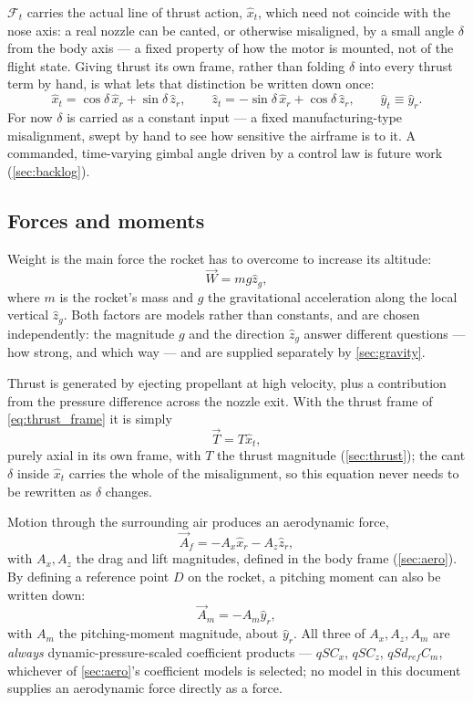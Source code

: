 $\mathcal{F}_t$ carries the actual line of thrust action, $\hat{x}_t$, which need not coincide
with the nose axis: a real nozzle can be canted, or otherwise misaligned, by a small angle
$\delta$ from the body axis --- a fixed property of how the motor is mounted, not of the flight
state. Giving thrust its own frame, rather than folding $\delta$ into every thrust term by hand,
is what lets that distinction be written down once:
\begin{equation}\label{eq:thrust_frame}
    \hat{x}_t = \cos\delta\,\hat{x}_r + \sin\delta\,\hat{z}_r, \qquad
    \hat{z}_t = -\sin\delta\,\hat{x}_r + \cos\delta\,\hat{z}_r, \qquad \hat{y}_t\equiv\hat{y}_r.
\end{equation}
For now $\delta$ is carried as a constant input --- a fixed manufacturing-type misalignment, swept
by hand to see how sensitive the airframe is to it. A commanded, time-varying gimbal angle driven
by a control law is future work (\autoref{sec:backlog}).

\subsection{Forces and moments}\label{sec:forces}
Weight is the main force the rocket has to overcome to increase its altitude:
\begin{equation}
    \vec{W} = mg\hat{z}_g,
\end{equation}
where $m$ is the rocket's mass and $g$ the gravitational acceleration along the local vertical
$\hat{z}_g$. Both factors are models rather than constants, and are chosen independently: the
magnitude $g$ and the direction $\hat{z}_g$ answer different questions --- how strong, and which
way --- and are supplied separately by \autoref{sec:gravity}.

Thrust is generated by ejecting propellant at high velocity, plus a contribution from the pressure
difference across the nozzle exit. With the thrust frame of \autoref{eq:thrust_frame} it is simply
\begin{equation}
    \vec{T} = T\hat{x}_t,
\end{equation}
purely axial in its own frame, with $T$ the thrust magnitude (\autoref{sec:thrust}); the cant
$\delta$ inside $\hat{x}_t$ carries the whole of the misalignment, so this equation never needs to
be rewritten as $\delta$ changes.

Motion through the surrounding air produces an aerodynamic force,
\begin{equation}
    \vec{A}_f = -A_x\hat{x}_r - A_z\hat{z}_r,
\end{equation}
with $A_x,A_z$ the drag and lift magnitudes, defined in the body frame (\autoref{sec:aero}). By
defining a reference point $D$ on the rocket, a pitching moment can also be written down:
\begin{equation}
    \vec{A}_m = -A_m\hat{y}_r,
\end{equation}
with $A_m$ the pitching-moment magnitude, about $\hat{y}_r$. All three of $A_x,A_z,A_m$ are
\emph{always} dynamic-pressure-scaled coefficient products --- $qSC_x$, $qSC_z$, $qSd_{ref}C_m$,
whichever of \autoref{sec:aero}'s coefficient models is selected; no model in this document
supplies an aerodynamic force directly as a force.

